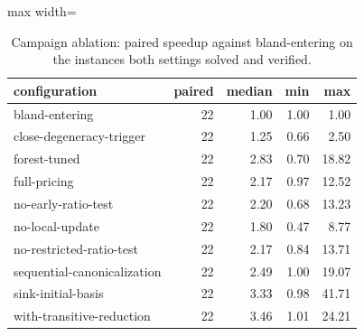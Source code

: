 \begin{table}[tbp]
\centering
\caption{Campaign ablation: paired speedup against bland-entering on the instances both settings solved and verified.}
\label{tab:ablation-speedup}
\small
\begin{adjustbox}{max width=\textwidth}
\begin{tabular}{lrrrr}
\toprule
configuration & paired & median & min & max \\
\midrule
bland-entering & 22 & 1.00 & 1.00 & 1.00 \\
close-degeneracy-trigger & 22 & 1.25 & 0.66 & 2.50 \\
forest-tuned & 22 & 2.83 & 0.70 & 18.82 \\
full-pricing & 22 & 2.17 & 0.97 & 12.52 \\
no-early-ratio-test & 22 & 2.20 & 0.68 & 13.23 \\
no-local-update & 22 & 1.80 & 0.47 & 8.77 \\
no-restricted-ratio-test & 22 & 2.17 & 0.84 & 13.71 \\
sequential-canonicalization & 22 & 2.49 & 1.00 & 19.07 \\
sink-initial-basis & 22 & 3.33 & 0.98 & 41.71 \\
with-transitive-reduction & 22 & 3.46 & 1.01 & 24.21 \\
\bottomrule
\end{tabular}
\end{adjustbox}
\end{table}
